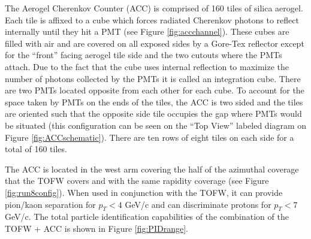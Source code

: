 The Aerogel Cherenkov Counter (ACC) is comprised of 160 tiles of silica aerogel. Each tile is affixed to a cube which forces radiated Cherenkov photons to reflect internally until they hit a PMT (see Figure \ref{fig:accchannel}). These cubes are filled with air and are covered on all exposed sides by a Gore-Tex reflector except for the ``front'' facing aerogel tile side and the two cutouts where the PMTs attach. Due to the fact that the cube uses internal reflection to maximize the number of photons collected by the PMTs it is called an integration cube. There are two PMTs located opposite from each other for each cube. To account for the space taken by PMTs on the ends of the tiles, the ACC is two sided and the tiles are oriented such that the opposite side tile occupies the gap where PMTs would be situated (this configuration can be seen on the ``Top View'' labeled diagram on Figure \ref{fig:ACCschematic}). There are ten rows of eight tiles on each side for a total of 160 tiles.

The ACC is located in the west arm covering the half of the azimuthal coverage that the TOFW covers and with the same rapidity coverage (see Figure \ref{fig:run8config}). When used in conjunction with the TOFW, it can provide pion/kaon separation for $p_{T} < 4$ GeV/c and can discriminate protons for $p_{T} < 7$ GeV/c.  The total particle identification capabilities of the combination of the TOFW + ACC is shown in Figure \ref{fig:PIDrange}.

